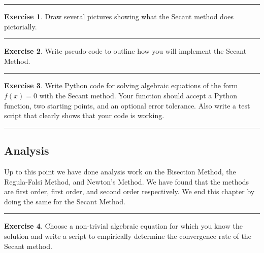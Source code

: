 \documentclass[
]{book}
\theoremstyle{definition}
\theoremstyle{definition}
\theoremstyle{definition}
\newtheorem{exercise}{Exercise}[chapter]
\theoremstyle{remark}
\begin{document}
\begin{center}\rule{0.5\linewidth}{0.5pt}\end{center}

\begin{exercise}
\protect\hypertarget{exr:unnamed-chunk-112}{}{\label{exr:unnamed-chunk-112} }Draw several pictures showing what the Secant method does pictorially.
\end{exercise}

\begin{center}\rule{0.5\linewidth}{0.5pt}\end{center}

\begin{exercise}
\protect\hypertarget{exr:unnamed-chunk-113}{}{\label{exr:unnamed-chunk-113} }Write pseudo-code to outline how you will implement the Secant Method.
\end{exercise}

\begin{center}\rule{0.5\linewidth}{0.5pt}\end{center}

\begin{exercise}
\protect\hypertarget{exr:unnamed-chunk-114}{}{\label{exr:unnamed-chunk-114} }Write Python code for solving algebraic equations of the form \(f(x) = 0\) with
the Secant method. Your function should accept a Python function, two starting points, and an optional error tolerance. Also write a test script that clearly shows that your
code is working.
\end{exercise}

\begin{center}\rule{0.5\linewidth}{0.5pt}\end{center}

\hypertarget{analysis-3}{%
\subsection{Analysis}\label{analysis-3}}

Up to this point we have done analysis work on the Bisection Method, the Regula-Falsi Method, and Newton's Method. We have found that the methods are first order, first order, and second order respectively. We end this chapter by doing the same for the Secant Method.

\begin{center}\rule{0.5\linewidth}{0.5pt}\end{center}

\begin{exercise}
\protect\hypertarget{exr:unnamed-chunk-115}{}{\label{exr:unnamed-chunk-115} }Choose a non-trivial algebraic equation for which you know the solution
and write a script to empirically determine the convergence rate of the
Secant method.
\end{exercise}
\end{document}
